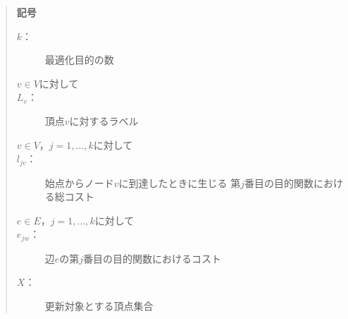 \documentclass[12pt]{optlab-bachelor}
\begin{document}
\begin{quote}
  \textbf{記号}
  \begin{description}
    \item[$k$：] 最適化目的の数
    \item[$v \in V$に対して]
    \item[$L_v$：] 頂点$v$に対するラベル
    \item[$v \in V$，$j = 1 , \ldots , k$に対して]
    \item[$l_{jv}$：] 始点からノード$v$に到達したときに生じる
    第$j$番目の目的関数における総コスト
    \item[$e \in E$，$j = 1 , \ldots , k$に対して]
    \item[$e_{jw}$：] 辺$e$の第$j$番目の目的関数におけるコスト
    \item[$X$：] 更新対象とする頂点集合
  \end{description}
\end{quote}
\end{document}
